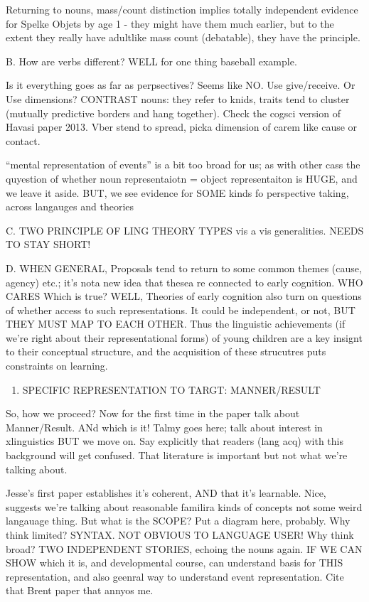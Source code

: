\documentclass[english,man]{apa6}
\providecommand{\tightlist}{%
  \setlength{\itemsep}{0pt}\setlength{\parskip}{0pt}}
\theoremstyle{definition}
\theoremstyle{definition}
\theoremstyle{remark}
\begin{document}
Returning to nouns, mass/count distinction implies totally independent
evidence for Spelke Objets by age 1 - they might have them much earlier,
but to the extent they really have adultlike mass count (debatable),
they have the principle.

B. How are verbs different? WELL for one thing baseball example.

Is it everything goes as far as perpsectives? Seems like NO. Use
give/receive. Or Use dimensions? CONTRAST nouns: they refer to knids,
traits tend to cluster (mutually predictive borders and hang together).
Check the cogsci version of Havasi paper 2013. Vber stend to spread,
picka dimension of carem like cause or contact.

\enquote{mental representation of events} is a bit too broad for us; as
with other cass the quyestion of whether noun representaiotn = object
representaiton is HUGE, and we leave it aside. BUT, we see evidence for
SOME kinds fo perspective taking, across langauges and theories

C. TWO PRINCIPLE OF LING THEORY TYPES vis a vis generalities. NEEDS TO
STAY SHORT!

D. WHEN GENERAL, Proposals tend to return to some common themes (cause,
agency) etc.; it's nota new idea that thesea re connected to early
cognition. WHO CARES Which is true? WELL, Theories of early cognition
also turn on questions of whether access to such representations. It
could be independent, or not, BUT THEY MUST MAP TO EACH OTHER. Thus the
linguistic achievements (if we're right about their representational
forms) of young children are a key insignt to their conceptual
structure, and the acquisition of these strucutres puts constraints on
learning.

\begin{enumerate}
\def\labelenumi{\Roman{enumi}.}
\setcounter{enumi}{2}
\tightlist
\item
  SPECIFIC REPRESENTATION TO TARGT: MANNER/RESULT
\end{enumerate}

So, how we proceed? Now for the first time in the paper talk about
Manner/Result. ANd which is it! Talmy goes here; talk about interest in
xlinguistics BUT we move on. Say explicitly that readers (lang acq) with
this background will get confused. That literature is important but not
what we're talking about.

Jesse's first paper establishes it's coherent, AND that it's learnable.
Nice, suggests we're talking about reasonable familira kinds of concepts
not some weird langauage thing. But what is the SCOPE? Put a diagram
here, probably. Why think limited? SYNTAX. NOT OBVIOUS TO LANGUAGE USER!
Why think broad? TWO INDEPENDENT STORIES, echoing the nouns again. IF WE
CAN SHOW which it is, and developmental course, can understand basis for
THIS representation, and also geenral way to understand event
representation. Cite that Brent paper that annyos me.
\end{document}
